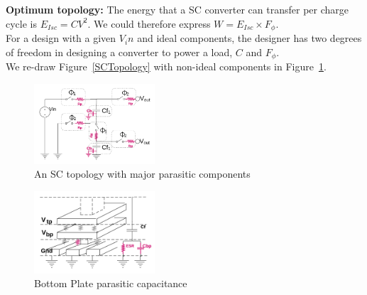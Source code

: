 \documentclass[letterpaper,twocolumn,10pt]{article}
\begin{document}
\textbf{Optimum topology: }The energy that a SC converter can transfer per charge cycle is $E_{Isc} = CV^2$. We could therefore express $W = E_{Isc}\times F_\phi$.\\
For a design with a given $V_in$ and ideal components, the designer has two degrees of freedom in designing a converter to power a load, $C$ and $F_\phi$.\\  
We re-draw Figure~\ref{SCTopology} with non-ideal components in Figure~\ref{NonIdealSCTopology}.\\
\begin{figure}[here]
\includegraphics[width=0.4\textwidth]{SCTopologyParasitics}
\caption{An SC topology with major parasitic components}
\label{NonIdealSCTopology}
\end{figure}
\begin{figure}[here]
\includegraphics[width=0.4\textwidth]{BottomPlateCap}
\caption{Bottom Plate parasitic capacitance}
\label{BottomPlatePar}
\end{figure}
\end{document}
